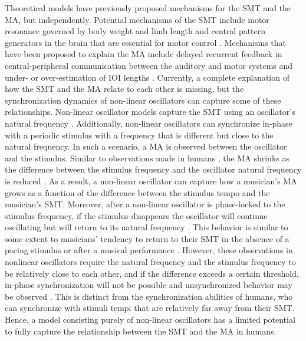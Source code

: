\documentclass[10pt,letterpaper]{article}
\begin{document}
Theoretical models have previously proposed mechanisms for the SMT and the MA, but independently. Potential mechanisms of the SMT include motor resonance governed by body weight and limb length \cite{goodman2000advantages} and central pattern generators in the brain that are essential for motor control \cite{latash1992virtual, wolpert2007probabilistic}. Mechanisms that have been proposed to explain the MA include delayed recurrent feedback in central-peripheral communication between the auditory and motor systems \cite{stepp2010strong, roman2019delayed, aschersleben2002temporal} and under- or over-estimation of IOI lengths \cite{loehr2009subdividing}. Currently, a complete explanation of how the SMT and the MA relate to each other is missing, but the synchronization dynamics of non-linear oscillators can capture some of these relationships. Non-linear oscillator models capture the SMT using an oscillator's natural frequency \cite{large2002tracking, large2002perceiving, mcauley2006time}. Additionally, non-linear oscillators can synchronize in-phase with a periodic stimulus with a frequency that is different but close to the natural frequency. In such a scenario, a MA is observed between the oscillator and the stimulus. Similar to observations made in humans \cite{scheurich2018tapping}, the MA shrinks as the difference between the stimulus frequency and the oscillator natural frequency is reduced \cite{kim2015signal, kim2019mode}. As a result, a non-linear oscillator can capture how a musician's MA grows as a function of the difference between the stimulus tempo and the musician's SMT. Moreover, after a non-linear oscillator is phase-locked to the stimulus frequency, if the stimulus disappears the oscillator will continue oscillating but will return to its natural frequency \cite{kim2015signal, kim2019mode}. This behavior is similar  to some extent to musicians’ tendency to return to their SMT in the absence of a pacing stimulus \cite{zamm2018musicians} or after a musical performance \cite{zamm2016endogenous}. However, these observations in nonlinear oscillators require the natural frequency and the stimulus frequency to be relatively close to each other, and if the difference exceeds a certain threshold, in-phase synchronization will not be possible and unsynchronized behavior may be observed \cite{kim2015signal, kim2019mode}. This is distinct from  the synchronization abilities of humans, who can synchronize with stimuli tempi that are relatively far away from their SMT. Hence, a model consisting purely of non-linear oscillators has a limited potential to fully capture the relationship between the SMT and the MA in humans.
\end{document}
